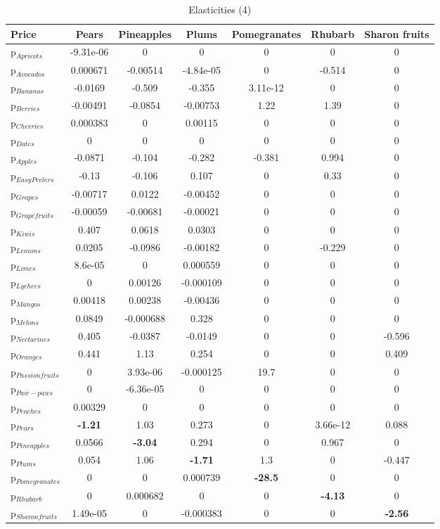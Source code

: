 \documentclass[11pt]{article}
\begin{document}
\begin{table}[h]
\caption{Elasticities (4)}
\label{table:elasticities 4}
\begin{center}
\begin{tabular}{lcccccc} \hline \hline
Price &Pears &Pineapples &Plums &Pomegranates &Rhubarb &Sharon fruits \\ \hline
p$_{Apricots}$ &-9.31e-06 &0 &0 &0 &0 &0 \\
p$_{Avocados}$ &0.000671 &-0.00514 &-4.84e-05 &0 &-0.514 &0 \\
p$_{Bananas}$ &-0.0169 &-0.509 &-0.355 &3.11e-12 &0 &0 \\
p$_{Berries}$ &-0.00491 &-0.0854 &-0.00753 &1.22 &1.39 &0 \\
p$_{Cherries}$ &0.000383 &0 &0.00115 &0 &0 &0 \\
p$_{Dates}$ &0 &0 &0 &0 &0 &0 \\
p$_{Apples}$ &-0.0871 &-0.104 &-0.282 &-0.381 &0.994 &0 \\
p$_{Easy Peelers}$ &-0.13 &-0.106 &0.107 &0 &0.33 &0 \\
p$_{Grapes}$ &-0.00717 &0.0122 &-0.00452 &0 &0 &0 \\
p$_{Grapefruits}$ &-0.00059 &-0.00681 &-0.00021 &0 &0 &0 \\
p$_{Kiwis}$ &0.407 &0.0618 &0.0303 &0 &0 &0 \\
p$_{Lemons}$ &0.0205 &-0.0986 &-0.00182 &0 &-0.229 &0 \\
p$_{Limes}$ &8.6e-05 &0 &0.000559 &0 &0 &0 \\
p$_{Lychees}$ &0 &0.00126 &-0.000109 &0 &0 &0 \\
p$_{Mangos}$ &0.00418 &0.00238 &-0.00436 &0 &0 &0 \\
p$_{Melons}$ &0.0849 &-0.000688 &0.328 &0 &0 &0 \\
p$_{Nectarines}$ &0.405 &-0.0387 &-0.0149 &0 &0 &-0.596 \\
p$_{Oranges}$ &0.441 &1.13 &0.254 &0 &0 &0.409 \\
p$_{Passion fruits}$ &0 &3.93e-06 &-0.000125 &19.7 &0 &0 \\
p$_{Paw-paws}$ &0 &-6.36e-05 &0 &0 &0 &0 \\
p$_{Peaches}$ &0.00329 &0 &0 &0 &0 &0 \\
p$_{Pears}$ &\textbf{-1.21} &1.03 &0.273 &0 &3.66e-12 &0.088 \\
p$_{Pineapples}$ &0.0566 &\textbf{-3.04} &0.294 &0 &0.967 &0 \\
p$_{Plums}$ &0.054 &1.06 &\textbf{-1.71} &1.3 &0 &-0.447 \\
p$_{Pomegranates}$ &0 &0 &0.000739 &\textbf{-28.5} &0 &0 \\
p$_{Rhubarb}$ &0 &0.000682 &0 &0 &\textbf{-4.13} &0 \\
p$_{Sharon fruits}$ &1.49e-05 &0 &-0.000383 &0 &0 &\textbf{-2.56} \\
\end{tabular}
\end{center}
\end{table}
\end{document}
